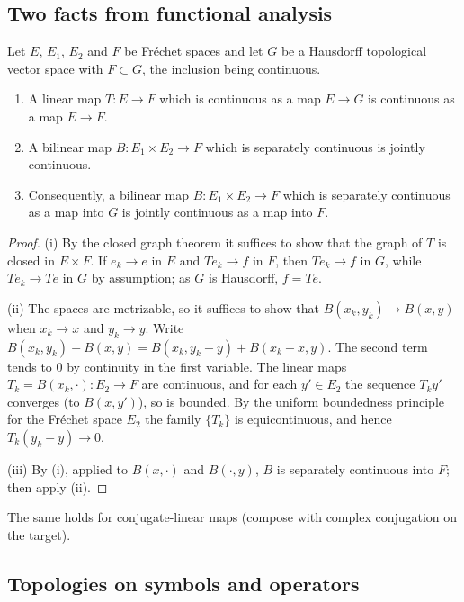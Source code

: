 \subsection{Two facts from functional analysis}

\begin{lemma}\label{euclidean:lem:auto-continuity}
  Let $E$, $E_1$, $E_2$ and $F$ be Fr\'echet spaces and let $G$ be a
  Hausdorff topological vector space with $F\subset G$, the inclusion being
  continuous.
  \begin{enumerate}[label=\textup{(\roman*)}]
  \item A linear map $T:E\to F$ which is continuous as a map $E\to G$ is
    continuous as a map $E\to F$.
  \item A bilinear map $B:E_1\times E_2\to F$ which is separately continuous
    is jointly continuous.
  \item Consequently, a bilinear map $B:E_1\times E_2\to F$ which is
    separately continuous as a map into $G$ is jointly continuous as a map
    into $F$.
  \end{enumerate}
\end{lemma}
\begin{proof}
  (i) By the closed graph theorem it suffices to show that the graph of $T$
  is closed in $E\times F$. If $e_k\to e$ in $E$ and $Te_k\to f$ in $F$, then
  $Te_k\to f$ in $G$, while $Te_k\to Te$ in $G$ by assumption; as $G$ is
  Hausdorff, $f=Te$.

  (ii) The spaces are metrizable, so it suffices to show that
  $B(x_k,y_k)\to B(x,y)$ when $x_k\to x$ and $y_k\to y$. Write
  $B(x_k,y_k)-B(x,y)=B(x_k,y_k-y)+B(x_k-x,y)$. The second term tends to $0$
  by continuity in the first variable. The linear maps
  $T_k=B(x_k,\cdot):E_2\to F$ are continuous, and for each $y'\in E_2$ the
  sequence $T_ky'$ converges (to $B(x,y')$), so is bounded. By the uniform
  boundedness principle for the Fr\'echet space $E_2$ the family $\{T_k\}$ is
  equicontinuous, and hence $T_k(y_k-y)\to0$.

  (iii) By (i), applied to $B(x,\cdot)$ and $B(\cdot,y)$, $B$ is separately
  continuous into $F$; then apply (ii).
\end{proof}

The same holds for conjugate-linear maps (compose with complex conjugation
on the target).

\subsection{Topologies on symbols and operators}

